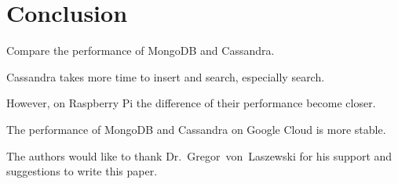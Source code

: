 \section{Conclusion}
Compare the performance of MongoDB and Cassandra. 

Cassandra takes more time to insert and search, especially search. 

However, on Raspberry Pi the difference of their performance become closer.

The performance of MongoDB and Cassandra on Google Cloud is more stable.


\begin{acks}

  The authors would like to thank Dr.~Gregor~von~Laszewski for his
  support and suggestions to write this paper.

\end{acks}


 


